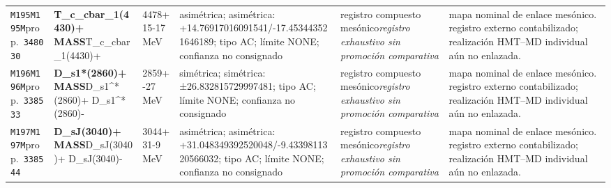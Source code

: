 \begin{landscape}
\begin{longtable}{L{1.85cm}L{4.45cm}L{2.35cm}L{4.05cm}L{3.35cm}L{7.15cm}}
\texttt{M195}\newline \texttt{M195M}\newline prop.\ \texttt{348030} & \textbf{T\_\allowbreak{}c\_\allowbreak{}cbar\_\allowbreak{}1(4430)+ MASS}\newline T\_\allowbreak{}c\_\allowbreak{}cbar\_\allowbreak{}1(4430)+ & 4478+15-17\,MeV & asimétrica; asimétrica: +14.76917016091541/-17.453443521646189; tipo AC; límite NONE; confianza no consignado & registro compuesto mesónico\newline \emph{registro exhaustivo sin promoción comparativa} & mapa nominal de enlace mesónico. registro externo contabilizado; realización HMT--MD individual aún no enlazada. \\
\texttt{M196}\newline \texttt{M196M}\newline prop.\ \texttt{338533} & \textbf{D\_\allowbreak{}s1*(2860)+ MASS}\newline D\_\allowbreak{}s1\textasciicircum{}*(2860)+ \textbar{}\allowbreak{} D\_\allowbreak{}s1\textasciicircum{}*(2860)- & 2859+-27\,MeV & simétrica; simétrica: ±26.832815729997481; tipo AC; límite NONE; confianza no consignado & registro compuesto mesónico\newline \emph{registro exhaustivo sin promoción comparativa} & mapa nominal de enlace mesónico. registro externo contabilizado; realización HMT--MD individual aún no enlazada. \\
\texttt{M197}\newline \texttt{M197M}\newline prop.\ \texttt{338544} & \textbf{D\_\allowbreak{}sJ(3040)+ MASS}\newline D\_\allowbreak{}sJ(3040)+ \textbar{}\allowbreak{} D\_\allowbreak{}sJ(3040)- & 3044+31-9\,MeV & asimétrica; asimétrica: +31.048349392520048/-9.4339811320566032; tipo AC; límite NONE; confianza no consignado & registro compuesto mesónico\newline \emph{registro exhaustivo sin promoción comparativa} & mapa nominal de enlace mesónico. registro externo contabilizado; realización HMT--MD individual aún no enlazada. \\

\end{longtable}
\end{landscape}
